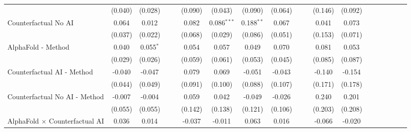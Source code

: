 \begin{tabular}{lcccccccccccccccccc}
                                                              & (0.040) & (0.028)     &     &     & (0.090) & (0.043)       & (0.090)       & (0.064)      &     &      & (0.146) & (0.092) &      &      &      &      &      &   \\   
   Counterfactual No AI                                       & 0.064   & 0.012       &     &     & 0.082   & 0.086$^{***}$ & 0.188$^{**}$  & 0.067        &     &      & 0.041   & 0.073   &      &      &      &      &      &   \\   
                                                              & (0.037) & (0.022)     &     &     & (0.068) & (0.029)       & (0.086)       & (0.051)      &     &      & (0.153) & (0.071) &      &      &      &      &      &   \\   
   AlphaFold - Method                                         & 0.040   & 0.055$^{*}$ &     &     & 0.054   & 0.057         & 0.049         & 0.070        &     &      & 0.081   & 0.053   &      &      &      &      &      &   \\   
                                                              & (0.029) & (0.026)     &     &     & (0.059) & (0.061)       & (0.053)       & (0.045)      &     &      & (0.085) & (0.087) &      &      &      &      &      &   \\   
   Counterfactual AI - Method                                 & -0.040  & -0.047      &     &     & 0.079   & 0.069         & -0.051        & -0.043       &     &      & -0.140  & -0.154  &      &      &      &      &      &   \\   
                                                              & (0.044) & (0.049)     &     &     & (0.091) & (0.100)       & (0.088)       & (0.107)      &     &      & (0.171) & (0.178) &      &      &      &      &      &   \\   
   Counterfactual No AI - Method                              & -0.007  & -0.004      &     &     & 0.059   & 0.042         & -0.049        & -0.026       &     &      & 0.240   & 0.201   &      &      &      &      &      &   \\   
                                                              & (0.055) & (0.055)     &     &     & (0.142) & (0.138)       & (0.121)       & (0.106)      &     &      & (0.203) & (0.208) &      &      &      &      &      &   \\   
   AlphaFold $\times$ Counterfactual AI                       & 0.036   & 0.014       &     &     & -0.037  & -0.011        & 0.063         & 0.016        &     &      & -0.066  & -0.020  &      &      &      &      &      &   \\   

\end{tabular}
